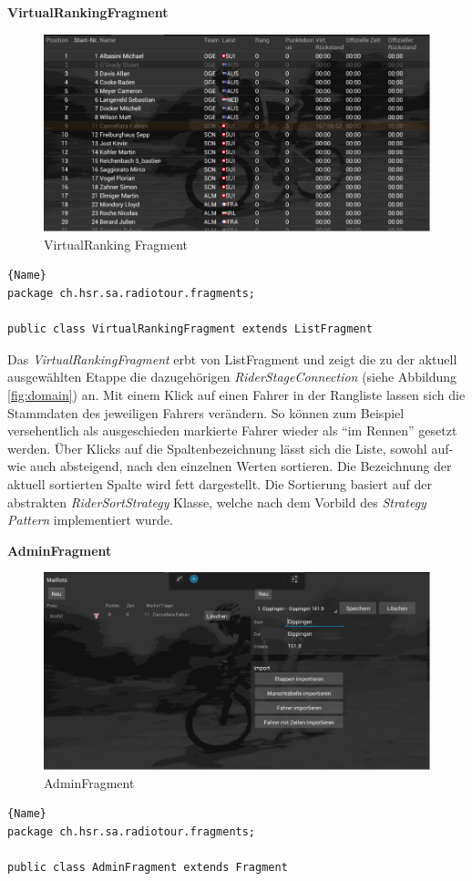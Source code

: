\textbf{VirtualRankingFragment}

\begin{figure}[h!]
\caption{VirtualRanking Fragment}
\label{fig:virtualrankingfragment}
\centering
\includegraphics[scale=0.8]{07anhang/images/dev_virtual.png}
\end{figure}

\begin{lstlisting}{Name}
package ch.hsr.sa.radiotour.fragments;

public class VirtualRankingFragment extends ListFragment
\end{lstlisting}

Das \textit{VirtualRankingFragment} erbt von ListFragment und zeigt die zu der aktuell ausgewählten Etappe die dazugehörigen \textit{RiderStageConnection} (siehe Abbildung \ref{fig:domain}) an. Mit einem Klick auf einen Fahrer in der Rangliste lassen sich die Stammdaten des jeweiligen Fahrers verändern. So können zum Beispiel versehentlich als ausgeschieden markierte Fahrer wieder als "`im Rennen"' gesetzt werden. Über Klicks auf die Spaltenbezeichnung lässt sich die Liste, sowohl auf- wie auch absteigend, nach den einzelnen Werten sortieren. Die Bezeichnung der aktuell sortierten Spalte wird fett dargestellt. Die Sortierung basiert auf der abstrakten \textit{RiderSortStrategy} Klasse, welche nach dem Vorbild des \textit{Strategy Pattern} implementiert wurde. 

\textbf{AdminFragment}

\begin{figure}[h!]
\caption{AdminFragment}
\label{fig:adminfragment}
\centering
\includegraphics[scale=0.8]{07anhang/images/dev_adminfragment.png}
\end{figure}
\begin{lstlisting}{Name}
package ch.hsr.sa.radiotour.fragments;

public class AdminFragment extends Fragment
\end{lstlisting}


